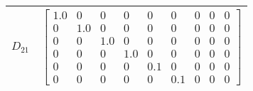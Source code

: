 \begin{tabular}{cl}
 $D_{21}$ & $\left[\begin{matrix}1.0 & 0 & 0 & 0 & 0 & 0 & 0 & 0 & 0\\0 & 1.0 & 0 & 0 & 0 & 0 & 0 & 0 & 0\\0 & 0 & 1.0 & 0 & 0 & 0 & 0 & 0 & 0\\0 & 0 & 0 & 1.0 & 0 & 0 & 0 & 0 & 0\\0 & 0 & 0 & 0 & 0.1 & 0 & 0 & 0 & 0\\0 & 0 & 0 & 0 & 0 & 0.1 & 0 & 0 & 0\end{matrix}\right]$                                                                                                                                                                                                                                                                                                                                                                                                                                                                                                                                                                                                                                                                                                                                                                                                                                                                                                                                                                                                                                                                                                                                                                                                                                                                                                                                                                                                                                                                                                                                                                                                                                                                                                                                                                                                                                                                                                                                                                                                            \\
\hline
\end{tabular}